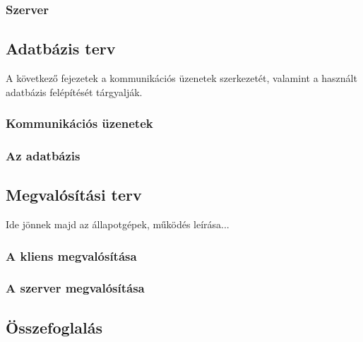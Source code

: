 \subsubsection{Szerver}
\label{sec:szerverinterfesz}

\subsection{Adatbázis terv}

A következő fejezetek a kommunikációs üzenetek szerkezetét, valamint a használt adatbázis felépítését tárgyalják.

\subsubsection{Kommunikációs üzenetek}
\label{sec:komm_uzenetek}

\subsubsection{Az adatbázis}
\label{sec:adatb}

\subsection{Megvalósítási terv}
\label{sec:megvalositas}

Ide jönnek majd az állapotgépek, működés leírása...

\subsubsection{A kliens megvalósítása}
\label{sec:kliensmegvalositas}

\subsubsection{A szerver megvalósítása}
\label{sec:szervermegvalositas}


\subsection{Összefoglalás}

